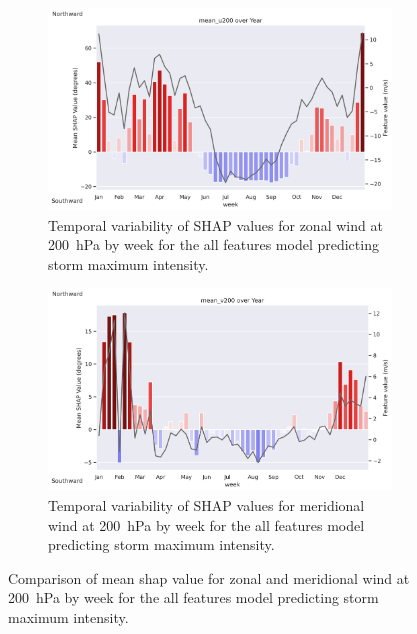 \begin{figure}[ht]
    \centering
    \begin{subfigure}[t]{\textwidth}
        \centering
        \includegraphics[width=\textwidth]{../figures/generated/experiments/storm_direction/temporal_corr/storm_direction_all_shap_mean_u200_by_week_over_year.png}
        \caption{Temporal variability of SHAP values for zonal wind at \SI{200}{\hecto\pascal} by week for the all features model predicting storm maximum intensity.}
        \label{fig:storm_direction_all_shap_mean_u200_by_week_over_year}
    \end{subfigure}
    \vspace{1em}
    \begin{subfigure}[t]{\textwidth}
        \centering
        \includegraphics[width=\textwidth]{../figures/generated/experiments/storm_direction/temporal_corr/storm_direction_all_shap_mean_v200_by_week_over_year.png}
        \caption{Temporal variability of SHAP values for meridional wind at \SI{200}{\hecto\pascal} by week for the all features model predicting storm maximum intensity.}
        \label{fig:storm_direction_all_shap_mean_v200_by_week_over_year}
    \end{subfigure}
    \caption{Comparison of mean \acrshort{shap} value for zonal and meridional wind at \SI{200}{\hecto\pascal} by week for the all features model predicting storm maximum intensity.}
    \label{fig:storm_direction_wind_200_by_week_over_year}
\end{figure}


